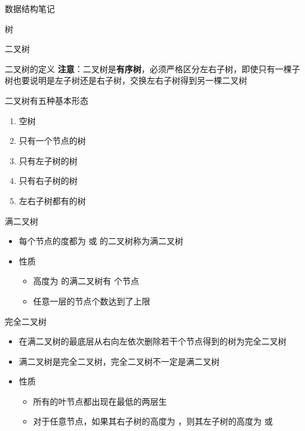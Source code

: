 \documentclass[
  ignorenonframetext,
]{beamer}
\providecommand{\tightlist}{%
  \setlength{\itemsep}{0pt}\setlength{\parskip}{0pt}}
\begin{document}
\begin{frame}[fragile]{数据结构笔记}
\begin{block}{树}
\begin{block}{二叉树}
\begin{block}{二叉树的定义}
\textbf{注意}：二叉树是\textbf{有序树}，必须严格区分左右子树，即使只有一棵子树也要说明是左子树还是右子树，交换左右子树得到另一棵二叉树

二叉树有五种基本形态

\begin{enumerate}
\tightlist
\item
  空树
\item
  只有一个节点的树
\item
  只有左子树的树
\item
  只有右子树的树
\item
  左右子树都有的树
\end{enumerate}

\begin{block}{满二叉树}
\protect{}\label{ux6ee1ux4e8cux53c9ux6811}

\begin{itemize}
\tightlist
\item
  每个节点的度都为 {} 或 {} 的二叉树称为满二叉树
\item
  性质

  \begin{itemize}
  \tightlist
  \item
    高度为 {} 的满二叉树有 {} 个节点
  \item
    任意一层的节点个数达到了上限 {}
  \end{itemize}
\end{itemize}
\end{block}

\begin{block}{完全二叉树}
\protect{}\label{ux5b8cux5168ux4e8cux53c9ux6811}

\begin{itemize}
\tightlist
\item
  在满二叉树的最底层从右向左依次删除若干个节点得到的树为完全二叉树
\item
  满二叉树是完全二叉树，完全二叉树不一定是满二叉树
\item
  性质

  \begin{itemize}
  \tightlist
  \item
    所有的叶节点都出现在最低的两层生
  \item
    对于任意节点，如果其右子树的高度为 {}，则其左子树的高度为 {} 或 {}
  \end{itemize}
\end{itemize}
\end{block}
\end{block}


\end{block}
\end{block}
\end{frame}
\end{document}
